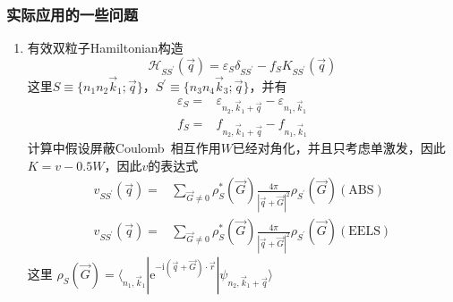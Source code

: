 \documentclass[cjk,slidestop,compress,mathserif,blue]{beamer}
\begin{document}
\frame
{
	\frametitle{实际应用的一些问题}
	\begin{enumerate}
		\item 有效双粒子\textrm{Hamiltonian}构造
			\begin{displaymath}
				\mathcal{H}_{SS^{\prime}}(\vec q)=\varepsilon_S\delta_{SS^{\prime}}-f_SK_{SS^{\prime}}(\vec q)
			\end{displaymath}
			这里$S\equiv\{n_1n_2\vec k_1;\vec q\}$，$S^{\prime}\equiv\{n_3n_4\vec k_3;\vec q\}$，并有
			\begin{displaymath}
				\begin{aligned}
					\varepsilon_S=&\varepsilon_{n_2,\vec k_1+\vec q}-\varepsilon_{n_1,\vec k_1}\\
					f_S=&f_{n_2,\vec k_1+\vec q}-f_{n_1,\vec k_1}
				\end{aligned}
			\end{displaymath}
			计算中假设屏蔽\textrm{Coulomb~}相互作用$W$已经对角化，并且只考虑单激发，因此$K=v-0.5W$，因此$v$的表达式
			\begin{displaymath}
				\begin{aligned}
					v_{SS^{\prime}}(\vec q)=&\sum_{\vec G\neq0}\rho_S^{\ast}(\vec G)\frac{4\pi}{|\vec q+\vec G|^2}\rho_{S^{\prime}}(\vec G)(\mathrm{ABS})\\
					v_{SS^{\prime}}(\vec q)=&\sum_{\vec G\neq0}\rho_S^{\ast}(\vec G)\frac{4\pi}{|\vec q+\vec G|^2}\rho_{S^{\prime}}(\vec G)(\mathrm{EELS})
				\end{aligned}
			\end{displaymath}
			这里
				$\rho_S(\vec G)=\langle_{n_1,\vec k_1}|\mathrm{e}^{-\mathrm{i}(\vec q+\vec G)\cdot\vec r}|\psi_{n_2,\vec k_1+\vec q}\rangle$
	\end{enumerate}
}
\end{document}
